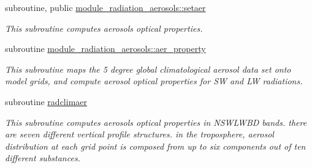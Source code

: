 {\bf }\par
\begin{DoxyCompactItemize}
\item 
subroutine, public \hyperlink{group__module__radiation__aerosols_ga559549bedb091683f71a705a875222d8}{module\+\_\+radiation\+\_\+aerosols\+::setaer}
\begin{DoxyCompactList}\small\item\em This subroutine computes aerosols optical properties. \end{DoxyCompactList}\end{DoxyCompactItemize}

{\bf }\par
\begin{DoxyCompactItemize}
\item 
subroutine \hyperlink{group__module__radiation__aerosols_ga021aee92f6c64f78fc11e26d5b2288cf}{module\+\_\+radiation\+\_\+aerosols\+::aer\+\_\+property}
\begin{DoxyCompactList}\small\item\em This subroutine maps the 5 degree global climatological aerosol data set onto model grids, and compute aerosol optical properties for SW and LW radiations. \end{DoxyCompactList}\item 
subroutine \hyperlink{group__module__radiation__aerosols_gae60b55ebc37825b2c3c95f95b23ed558}{radclimaer}
\begin{DoxyCompactList}\small\item\em This subroutine computes aerosols optical properties in N\+S\+W\+L\+W\+BD bands. there are seven different vertical profile structures. in the troposphere, aerosol distribution at each grid point is composed from up to six components out of ten different substances. \end{DoxyCompactList}\end{DoxyCompactItemize}

